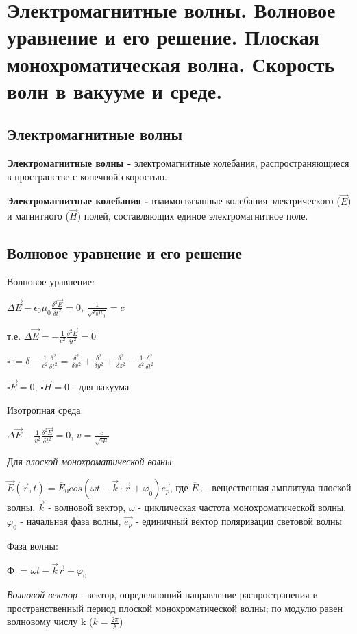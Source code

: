 \documentclass[12pt]{report}
\begin{document}
\section{Электромагнитные волны. Волновое уравнение и его решение. Плоская монохроматическая волна. Скорость волн в вакууме и среде.}
\subsection{Электромагнитные волны}
\textbf{Электромагнитные волны -} электромагнитные колебания, распространяющиеся в пространстве с конечной скоростью.\par
\textbf{Электромагнитные колебания -} взаимосвязанные колебания электрического ($\vec {E}$) и магнитного ($\vec {H}$) полей, составляющих единое электромагнитное поле.

\subsection{Волновое уравнение и его решение}
Волновое уравнение:\par
$\Delta \vec {E} - \epsilon_0 \mu_0 \frac{\delta^2 \vec {E}}{\delta t^2} = 0$,
$\frac{1}{\sqrt{\epsilon_0 \mu_0}} = c$\par
т.е. $\Delta \vec {E} = - \frac{1}{c^2} \frac{\delta^2 \vec {E}}{\delta t^2} = 0$\par
$\square := \delta  - \frac{1}{c^2} \frac{\delta^2}{\delta t^2} = \frac{\delta^2}{\delta x^2} + \frac{\delta^2}{\delta y^2} + \frac{\delta^2}{\delta z^2} - \frac{1}{c^2} \frac{\delta^2}{\delta t^2}$\par
$\square \vec {E} = 0$, $\square \vec {H} = 0$ - для вакуума\par
Изотропная среда:\par
$\Delta \vec {E} - \frac{1}{v^2} \frac{\delta^2 \vec {E}}{\delta t^2} = 0$, $v = \frac{c}{\sqrt{\epsilon \mu}}$\par
Для \textit{плоской монохроматической волны}:\par
$\vec {E} (\vec {r}, t) = \overline {E}_0 cos(\omega t - \vec {k} \cdot \vec {r} + \varphi_0)\vec {e_{p}}$, где $\overline {E}_0$ - вещественная амплитуда плоской волны, $\vec {k}$ - волновой вектор, $\omega$ - циклическая частота монохроматической волны,$\varphi_0$ - начальная фаза волны, $\vec {e_{p}}$ - единичный вектор поляризации световой волны\par
Фаза волны:\par
Ф $= \omega t - \vec {k} \vec {r} + \varphi_0$\par
\textit{Волновой вектор} - вектор, определяющий направление распространения и пространственный период плоской монохроматической волны; по модулю равен волновому числу k ($k = \frac{2 \pi}{\lambda}$)\par
\end{document}
